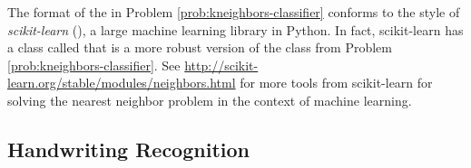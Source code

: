 \begin{info}
The format of the  in Problem \ref{prob:kneighbors-classifier} conforms to the style of \emph{scikit-learn} (), a large machine learning library in Python.
In fact, scikit-learn has a class called  that is a more robust version of the class from Problem \ref{prob:kneighbors-classifier}.
See \url{http://scikit-learn.org/stable/modules/neighbors.html} for more tools from scikit-learn for solving the nearest neighbor problem in the context of machine learning.
\end{info}

\begin{comment}
To determine the accuracy of a machine learning model, first divide the set of labeled data into a \emph{training set} and a \emph{test set}.
The training set is used to find potentially predictive relationships between the \emph{features}, or individual properties, of a data point.
In the bankruptcy example above, the incomes and debt levels were features of the data.
Relationships between features are discovered in the \emph{training phase} of machine learning.
In the nearest neighbor algorithm, the training phase consists of simply storing the training set.
The test set is a small subset (usually around 20\%) of the original data set.
During the \emph{test phase}, the accuracy of the model is calculated using the test set.
The test set is treated as a set of novel data, and is run through the model.
The model's classifications of the test data are compared to the actual labels of the test data.
The ratio of correct classifications to total number of instances in the test set is the accuracy of the model.

\subsection*{Breaking Ties}
Consider the illustration in Figure \ref{fig:k-nearest-neighbors}.
Suppose that the three neighbors of a new data point were found, but all of these neighbors had different classifications: one neighbor was of class A, one was B, and one was C.
How would the new instance be classified?
A common approach to dealing with ties is to remove the farthest neighbor's vote until a majority vote is found.
In some cases, this results in only the closest neighbor determining the output of a new instance.
\end{comment}

\subsection*{Handwriting Recognition} %

